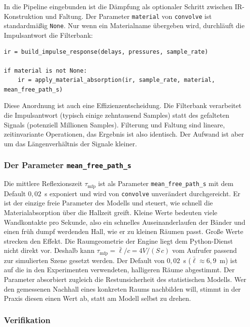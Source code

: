 In die Pipeline eingebunden ist die Dämpfung als optionaler Schritt zwischen
IR-Konstruktion und Faltung. Der Parameter \texttt{material} von \texttt{convolve}
ist standardmäßig \texttt{None}. Nur wenn ein Materialname übergeben wird,
durchläuft die Impulsantwort die Filterbank:

\begin{lstlisting}[style=cemdsp, caption={Einbindung in \texttt{convolve}: Materialdämpfung als optionaler Schritt.}, label={lst:einbindung}]
ir = build_impulse_response(delays, pressures, sample_rate)

if material is not None:
    ir = apply_material_absorption(ir, sample_rate, material, mean_free_path_s)
\end{lstlisting}

Diese Anordnung ist auch eine Effizienzentscheidung. Die Filterbank verarbeitet
die Impulsantwort (typisch einige zehntausend Samples) statt des gefalteten
Signals (potenziell Millionen Samples). Filterung und Faltung sind lineare,
zeitinvariante Operationen, das Ergebnis ist also identisch. Der Aufwand ist aber
um das Längenverhältnis der Signale kleiner.

\subsubsection{Der Parameter \texttt{mean\_free\_path\_s}}
\label{subsubsec:mfp}

Die mittlere Reflexionszeit $\tau_{\mathrm{mfp}}$ ist als Parameter
\texttt{mean\_free\_path\_s} mit dem Default $0{,}02$~s exponiert und wird von
\texttt{convolve} unverändert durchgereicht. Er ist der einzige freie Parameter
des Modells und steuert, wie schnell die Materialabsorption über die Hallzeit
greift. Kleine Werte bedeuten viele Wandkontakte pro Sekunde, also ein schnelles
Auseinanderlaufen der Bänder und einen früh dumpf werdenden Hall, wie er zu
kleinen Räumen passt. Große Werte strecken den Effekt. Die Raumgeometrie der
Engine liegt dem Python-Dienst nicht direkt vor. Deshalb kann
$\tau_{\mathrm{mfp}} = \bar{\ell}/c = 4V/(S\,c)$ vom Aufrufer passend zur
simulierten Szene gesetzt werden. Der Default von $0{,}02$~s
($\bar{\ell} \approx 6{,}9$~m) ist auf die in den Experimenten verwendeten,
halligeren Räume abgestimmt. Der Parameter absorbiert zugleich die
Restunsicherheit des statistischen Modells. Wer den gemessenen Nachhall eines
konkreten Raums nachbilden will, stimmt in der Praxis diesen einen Wert ab, statt
am Modell selbst zu drehen.

\subsubsection{Verifikation}
\label{subsubsec:material-verifikation}


